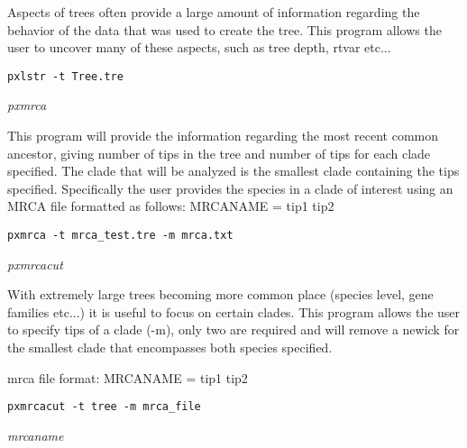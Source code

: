 \documentclass[12pt,letterpaper]{article}
\renewcommand{\subsection}[1]{%
\bigskip
\begin{center}
\begin{large}
\normalfont\itshape #1
\end{large}
\end{center}}
\begin{document}
Aspects of trees often provide a large amount of information regarding the behavior of the data that was used to create the tree. This program allows the user to uncover many of these aspects, such as tree depth, rtvar etc...

\begin{flushleft}
\begin{verbatim}
pxlstr -t Tree.tre
\end{verbatim}
\end{flushleft}

\subsection{pxmrca}

This program will provide the information regarding the most recent common ancestor, giving number of tips in the tree and number of tips for each clade specified. The clade that will be analyzed is the smallest clade containing the tips specified. Specifically the user provides the species in a clade of interest using an MRCA file formatted as follows:
MRCANAME = tip1 tip2

\begin{flushleft}
\begin{verbatim}
pxmrca -t mrca_test.tre -m mrca.txt
\end{verbatim}
\end{flushleft}


\subsection{pxmrcacut}

With extremely large trees becoming more common place (species level, gene families etc...) it is useful to focus on certain clades. This program allows the user to specify tips of a clade (-m), only two are required and will remove a newick for the smallest clade that encompasses both species specified.

mrca file format:
MRCANAME = tip1 tip2

\begin{flushleft}
\begin{verbatim}
pxmrcacut -t tree -m mrca_file
\end{verbatim}
\end{flushleft}

\subsection{mrcaname}
\end{document}
